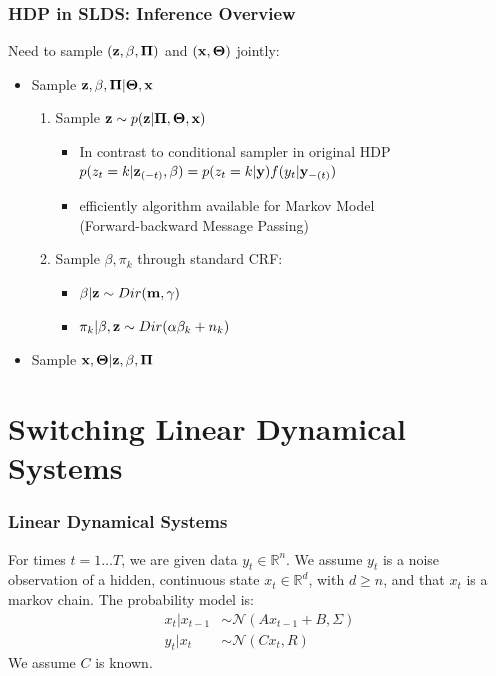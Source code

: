 \documentclass{beamer}
\begin{document}
\begin{frame}
\frametitle{HDP in SLDS: Inference Overview}
Need to sample $({\bf z}, \beta, \boldsymbol{\Pi})$ and $({\bf x}, \boldsymbol{\Theta})$ jointly:
\begin{itemize}
\item Sample ${\bf z}, \beta, \boldsymbol{\Pi} | \boldsymbol{\Theta}, {\bf x}$
\begin{enumerate}
\item Sample ${\bf z} \sim p({\bf z} | \boldsymbol{\Pi}, \boldsymbol{\Theta}, {\bf x})$
\begin{itemize}
\item In contrast to conditional sampler in original HDP \\
 $p(z_t = k| {\bf z}_{(-t)}, \beta) = p(z_t = k| {\bf y})f(y_t|{\bf y}_{-(t)})$
\item efficiently algorithm available for Markov Model\\
(Forward-backward Message Passing)
\end{itemize}
\item Sample $\beta, \pi_k$ through standard CRF:
\begin{itemize}
\item $\beta | {\bf z} \sim Dir({\bf m}, \gamma)$
\item $\pi_k | \beta, {\bf z} \sim Dir(\alpha \beta_k + n_k)$
\end{itemize}
\end{enumerate}
\item Sample ${\bf x}, \boldsymbol{\Theta} | {\bf z}, \beta, \boldsymbol{\Pi}$
\end{itemize}

\end{frame}



\section{Switching Linear Dynamical Systems}
\begin{frame}
\frametitle{Linear Dynamical Systems}

For times $t=1\ldots T$, we are given data $y_t\in\mathbb{R}^n$. We assume $y_t$ is a noise observation of a hidden, continuous state $x_t\in\mathbb{R}^d$, with $d\geq n$, and that $x_t$ is a markov chain. The probability model is:
\begin{align*}
x_t|x_{t-1}&\sim\mathcal{N}(Ax_{t-1}+B,\Sigma)\\
y_t|x_t&\sim\mathcal{N}(Cx_t,R)
\end{align*}
We assume $C$ is known.

\end{frame}
\end{document}
